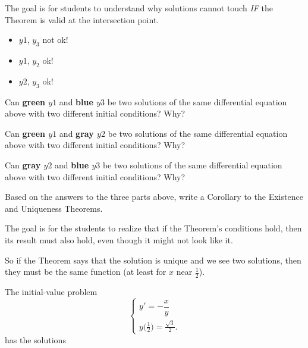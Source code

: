 \begin{annotation}
\begin{goals}
	The goal is for students to understand why solutions cannot touch \emph{IF} the Theorem is valid at the intersection point.
	
	\begin{itemize}
		\item  $y1$, $y_3$ not ok!
		\item  $y1$, $y_2$ ok!
		\item  $y2$, $y_3$ ok!
	\end{itemize}
\end{goals}	
\end{annotation}
\begin{parts}
	\item Can \textbf{\color{green} green $y1$} and \textbf{\color{cyan} blue $y3$} be two solutions of the same differential equation above with two different initial conditions? Why?
	\item Can \textbf{\color{green} green $y1$} and \textbf{\color{gray} gray $y2$} be two solutions of the same differential equation above with two different initial conditions? Why?
	\item Can \textbf{\color{gray} gray $y2$} and \textbf{\color{cyan} blue $y3$} be two solutions of the same differential equation above with two different initial conditions? Why?

	\item Based on the answers to the three parts above, write a Corollary to the Existence and Uniqueness Theorems.
\end{parts}









\bookonlynewpage


\begin{annotation}
\begin{goals}
	The goal is for the students to realize that if the Theorem's conditions hold, then its result must also hold, even though it might not look like it.
	
	So if the Theorem says that the solution is unique and we see two solutions, then they must be the same function (at least for $x$ near $\frac12$).
\end{goals}
\end{annotation}
\question The initial-value problem
$$
\begin{cases}
y' = -\dfrac{x}{y} \\
y\big(\frac12\big) = \frac{\sqrt{3}}{2}.
\end{cases}
$$
has the solutions

